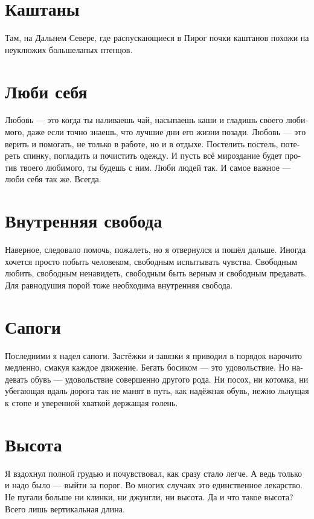 \documentclass[a4paper,12pt,fleqn]{book}\usepackage{polyglossia}\setdefaultlanguage[babelshorthands=true]{russian}\setotherlanguage{english}\defaultfontfeatures{Ligatures=TeX,Mapping=tex-text}\usepackage{xcolor}\newcommand{\ml}[3]{#2}
\begin{document}
{\section{Каштаны}

Там, на Дальнем Севере, где распускающиеся в Пирог почки каштанов похожи на неуклюжих большелапых птенцов.

\section{Люби себя}

Любовь --- это когда ты наливаешь чай, насыпаешь каши и гладишь своего любимого, даже если точно знаешь, что лучшие дни его жизни позади.
Любовь --- это верить и помогать, не только в работе, но и в отдыхе.
Постелить постель, потереть спинку, погладить и почистить одежду.
И пусть всё мироздание будет против твоего любимого, ты будешь с ним.
Люби людей так.
И самое важное --- люби себя так же.
Всегда.

\section{Внутренняя свобода}

Наверное, следовало помочь, пожалеть, но я отвернулся и пошёл дальше.
Иногда хочется просто побыть человеком, свободным испытывать чувства.
Свободным любить, свободным ненавидеть, свободным быть верным и свободным предавать.
Для равнодушия порой тоже необходима внутренняя свобода.

\section{Сапоги}

Последними я надел сапоги.
Застёжки и завязки я приводил в порядок нарочито медленно, смакуя каждое движение.
Бегать босиком --- это удовольствие.
Но надевать обувь --- удовольствие совершенно другого рода.
Ни посох, ни котомка, ни убегающая вдаль дорога так не манят в путь, как надёжная обувь, нежно льнущая к стопе и уверенной хваткой держащая голень.

\section{Высота}

Я вздохнул полной грудью и почувствовал, как сразу стало легче.
А ведь только и надо было --- выйти за порог.
Во многих случаях это единственное лекарство.
Не пугали больше ни клинки, ни джунгли, ни высота.
Да и что такое высота?
Всего лишь вертикальная длина.

}
\end{document}

